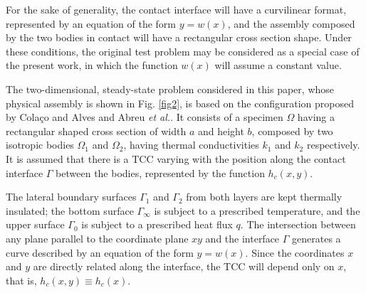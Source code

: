 \documentclass[conference,compsoc,fleqn]{IEEEtran}
\begin{document}
For the sake of generality, the contact interface will have a curvilinear format, represented by an equation of the form $y = w(x)$, and the assembly composed by the two bodies in contact will have a rectangular cross section shape. Under these conditions, the original test problem\cite{reciproc_3} may be considered as a special case of the present work, in which the function $w(x)$ will assume a constant value. 
\\


The two-dimensional, steady-state problem considered in this paper, whose physical assembly is shown in Fig. \ref{fig2}, is based on the configuration proposed by Colaço and Alves\cite{reciproc_3} and Abreu \textit{et al.}\cite{artigo_abreu_3}. It consists of a specimen $\Omega$ having a rectangular shaped cross section of width $a$ and height $b$, composed by two isotropic bodies $\Omega_1$ and $\Omega_2$, having thermal conductivities $k_1$ and $k_2$ respectively. It is assumed that there is a TCC varying with the position along the contact interface $\Gamma$ between the bodies, represented by the function $h_c(x, y)$.

The lateral boundary surfaces $\Gamma_1$ and $\Gamma_2$ from both layers are kept thermally insulated; the bottom surface $\Gamma_\infty$ is subject to a prescribed temperature, and the upper surface $\Gamma_0$ is subject to a prescribed heat flux $q$. The intersection between any plane parallel to the coordinate plane $xy$ and the interface $\Gamma$ generates a curve described by an equation of the form $y = w(x)$. Since the coordinates $x$ and $y$ are directly related along the interface, the TCC will depend only on $x$, that is, $h_c(x, y) \equiv h_c(x)$.
\end{document}
